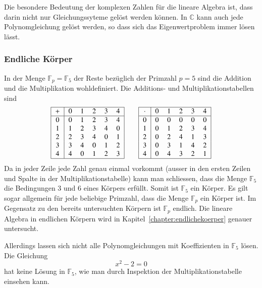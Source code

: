 Die besondere Bedeutung der komplexen Zahlen für die lineare Algebra ist, 
dass darin nicht nur Gleichungssyteme gelöst werden können.
In $\mathbb C$ kann auch jede Polynomgleichung gelöst werden, so dass
sich das Eigenwertproblem immer lösen lässt.

\subsubsection{Endliche Körper}
In der Menge $\mathbb F_p=\mathbb F_5$ der Reste bezüglich der Primzahl
$p=5$ sind die Addition und die Multiplikation wohldefiniert.
Die Additions- und Multiplikationstabellen sind
\[
\begin{tabular}{|c|ccccc|}
\hline
$+$&0&1&2&3&4\\
\hline
0&0&1&2&3&4\\
1&1&2&3&4&0\\
2&2&3&4&0&1\\
3&3&4&0&1&2\\
4&4&0&1&2&3\\
\hline
\end{tabular}
\qquad
\begin{tabular}{|c|ccccc|}
\hline
$\cdot$&0&1&2&3&4\\
\hline
0&0&0&0&0&0\\
1&0&1&2&3&4\\
2&0&2&4&1&3\\
3&0&3&1&4&2\\
4&0&4&3&2&1\\
\hline
\end{tabular}
\]
Da in jeder Zeile jede Zahl genau einmal vorkommt (ausser in den ersten
Zeilen und Spalte in der Multiplikationstabelle) kann man schliessen, dass
die Menge $\mathbb F_5$ die Bedingungen 3 und 6 eines Körpers erfüllt.
Somit ist $\mathbb F_5$ ein Körper.
Es gilt sogar allgemein für jede beliebige Primzahl, dass die Menge
$\mathbb F_p$ ein Körper ist.
Im Gegensatz zu den bereits untersuchten Körpern ist $\mathbb F_p$ endlich.
Die lineare Algebra in endlichen Körpern wird in
Kapitel~\ref{chapter:endlichekoerper} genauer untersucht.

Allerdings lassen sich nicht alle Polynomgleichungen mit Koeffizienten
in $\mathbb F_5$ lösen.
Die Gleichung
\[
x^2-2=0
\]
hat keine Lösung in $\mathbb F_5$, wie man durch Inspektion der
Multiplikationstabelle einsehen kann.


